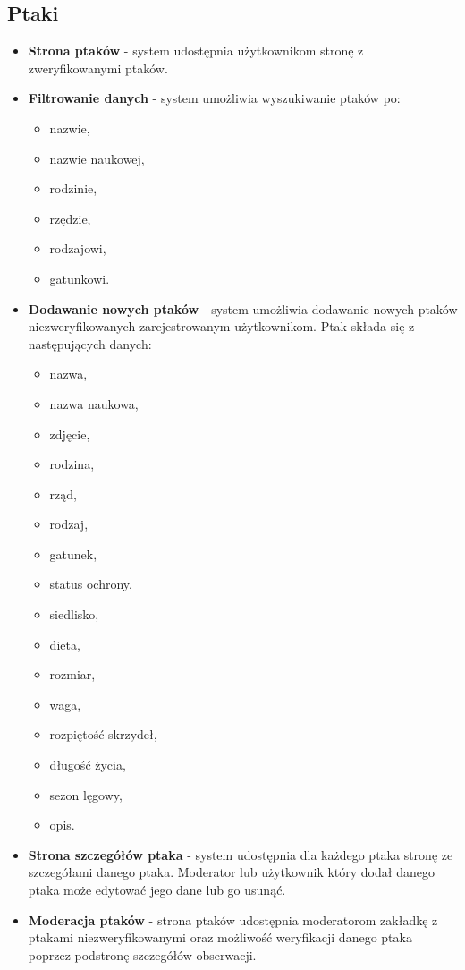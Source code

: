 \subsection{Ptaki}
\begin{itemize}
	\item \textbf{Strona ptaków} - system udostępnia użytkownikom stronę z zweryfikowanymi ptaków.
	\item \textbf{Filtrowanie danych} - system umożliwia wyszukiwanie ptaków po:
		\begin{itemize}
			\item nazwie,
			\item nazwie naukowej,
			\item rodzinie,
			\item rzędzie,
			\item rodzajowi,
			\item gatunkowi.
		\end{itemize}
	\item \textbf{Dodawanie nowych ptaków} - system umożliwia dodawanie nowych ptaków niezweryfikowanych zarejestrowanym użytkownikom. Ptak składa się z następujących danych:
	\begin{itemize}
		\item nazwa,
		\item nazwa naukowa,
		\item zdjęcie,
		\item rodzina,
		\item rząd,
		\item rodzaj,
		\item gatunek,
		\item status ochrony,
		\item siedlisko,
		\item dieta,
		\item rozmiar,
		\item waga,
		\item rozpiętość skrzydeł,
		\item długość życia,
		\item sezon lęgowy,
		\item opis.
	\end{itemize}
	\item \textbf{Strona szczegółów ptaka} - system udostępnia dla każdego ptaka stronę ze szczegółami danego ptaka.
		Moderator lub użytkownik który dodał danego ptaka może edytować jego dane lub go usunąć.
	\item \textbf{Moderacja ptaków} - strona ptaków udostępnia moderatorom zakładkę z ptakami niezweryfikowanymi oraz możliwość weryfikacji danego ptaka poprzez podstronę szczegółów obserwacji.
\end{itemize}

